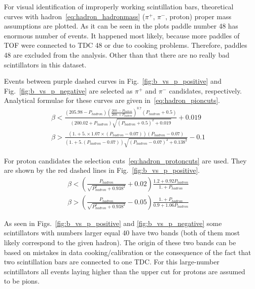 For visual identification of improperly working scintillation bars, theoretical curves with hadron~\ref{eq:hadron_hadronmass} ($\pi^{+}$, $\pi^{-}$, proton) proper mass assumptions are plotted. As it can be seen in the plots paddle number 48 has enormous number of events. It happened most likely, because more paddles of TOF were connected to TDC 48 or due to cooking problems. Therefore, paddles 48 are excluded from the analysis. Other than that there are no really bad scintillators in this dataset.

Events between purple dashed curves in Fig.~\ref{fig:b_vs_p_positive} and Fig.~\ref{fig:b_vs_p_negative} are selected as $\pi^{+}$ and $\pi^{-}$ candidates, respectively. Analytical formulae for these curves are given in~\ref{eq:hadron_pioncuts}.
\begin{equation}
\begin{aligned}
\beta <
\frac{(205.98-P_{hadron})\left(\frac{200.-P_{hadron}}{200.+P_{hadron}}\right)^{0.7}(P_{hadron}+0.5)}
{(200.02+P_{hadron})\sqrt{(P_{hadron}+0.5)^{2}+0.019}} + 0.019 \\
\beta > \frac{(1.+5.\times1.07\times(P_{hadron}-0.07))(P_{hadron}-0.07)}
{(1.+5.(P_{hadron}-0.07))\sqrt{(P_{hadron}-0.07)^{2}+0.138^{2}}} - 0.1
\label{eq:hadron_pioncuts}
\end{aligned}
\end{equation}

For proton candidates the selection cuts~\ref{eq:hadron_protoncuts} are used. They are shown by the red dashed lines in Fig.~\ref{fig:b_vs_p_positive}. 
\begin{equation}
\begin{aligned}
\beta <
\left(\frac{P_{hadron}}{\sqrt{P_{hadron}^{2}+0.938^{2}}}+0.02\right)\frac{1.2+0.92P_{hadron}}{1.+P_{hadron}}
\label{eq:hadron_protoncuts} \\
\beta > \left(\frac{P_{hadron}}{\sqrt{P_{hadron}^{2}+0.938^{2}}}-0.05\right)
\frac{1.+P_{hadron}}{0.9+1.06P_{hadron}} 
\end{aligned}
\end{equation}

As seen in Figs.~\ref{fig:b_vs_p_positive} and \ref{fig:b_vs_p_negative} some scintillators with numbers larger equal 40 have two bands (both of them most likely correspond to 
the given hadron). The origin of these two bands can be based on mistakes in data cooking/calibration or the consequence of the fact that two scintillation bars are connected to one TDC. For this large-number scintillators all events laying higher than the upper cut for protons are assumed to be pions.

